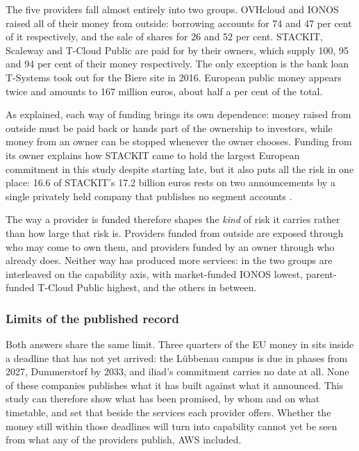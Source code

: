 The five providers fall almost entirely into two groups. OVHcloud and IONOS raised
all of their money from outside: borrowing accounts for 74 and 47
per cent of it respectively, and the sale of shares for 26 and 52 per cent.
STACKIT, Scaleway and T-Cloud Public are paid for by their owners, which supply
100, 95 and 94 per cent of their money respectively. The only exception is the
bank loan T-Systems took out for the Biere site in 2016. European public money
appears twice and amounts to 167 million euros, about half a per cent of the
total.

As  explained, each way of funding brings its own
dependence: money raised from outside must be paid back or hands part of the
ownership to investors, while money from an owner can be stopped whenever the owner
chooses. Funding from its owner explains how STACKIT came to hold the largest
European commitment in this study despite starting late, but it also puts all the
risk in one place:
16.6 of STACKIT's 17.2 billion euros rests on two announcements by a single
privately held company that publishes no segment accounts
\cite{Schwarz_Figures_FY2025}.

The way a provider is funded therefore shapes the \emph{kind} of risk it carries
rather than how large that risk is. Providers funded from outside are exposed
through who may come to own them, and providers funded by an owner through who
already does. Neither way has produced more services: in  the two groups are
interleaved on the capability axis, with market-funded IONOS lowest, parent-funded
T-Cloud Public highest, and the others in between.

\subsubsection*{Limits of the published record}

Both answers share the same limit. Three quarters of the \acs{EU} money in
 sits inside a deadline that has not yet arrived: the
L\"ubbenau campus is due in phases from 2027, Dummerstorf by 2033, and iliad's
commitment carries no date at all. None of these companies publishes what it has
built against what it announced. This study can therefore show what has been promised, by whom and on what
timetable, and set that beside the services each provider offers. Whether the money
still within those deadlines will turn into capability cannot yet be seen from what
any of the providers publish, \acs{AWS} included.
